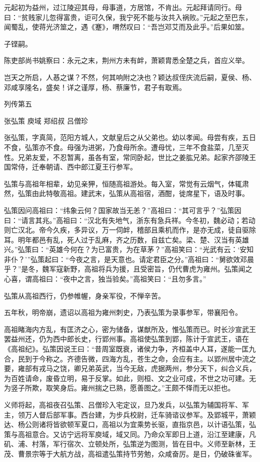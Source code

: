 \documentclass[12pt,UTF8]{ctexbook}
\begin{document}
元起初为益州，过江陵迎其母，母事道，方居馆，不肯出。元起拜请同行。母曰：“贫贱家儿忽得富贵，讵可久保，我宁死不能与汝共入祸败。”元起之至巴东，闻蜀乱，使蒋光济筮之，遇《蹇》，喟然叹曰：“吾岂邓艾而及此乎。”后果如筮。

子铿嗣。

陈吏部尚书姚察曰：永元之末，荆州方未有衅，萧颖胄悉全楚之兵，首应义举。

岂天之所启，人惎之谋？不然，何其响附之决也？颖达叔侄庆流后嗣，夏侯、杨、邓咸享隆名，盛矣！详之谨厚，杨、蔡廉节，君子有取焉。





列传第五

张弘策 庾域 郑绍叔 吕僧珍

张弘策，字真简，范阳方城人，文献皇后之从父弟也。幼以孝闻。母尝有疾，五日不食，弘策亦不食。母强为进粥，乃食母所余。遭母忧，三年不食盐菜，几至灭性。兄弟友爱，不忍暂离，虽各有室，常同卧起，世比之姜肱兄弟。起家齐邵陵王国常侍，迁奉朝请、西中郎江夏王行参军。

弘策与高祖年相辈，幼见亲狎，恒随高祖游处。每入室，常觉有云烟气，体辄肃然，弘策由此特敬高祖。建武末，弘策从高祖宿，酒酣，徙席星下，语及时事。

弘策因问高祖曰：“纬象云何？国家故当无恙？”高祖曰：“其可言乎？”弘策因曰：“请言其兆。”高祖曰：“汉北有失地气，浙东有急兵祥。今冬初，魏必动；若动则亡汉北。帝今久疾，多异议，万一伺衅，稽部且乘机而作，是亦无成，徒自驱除耳。明年都邑有乱，死人过于乱麻，齐之历数，自兹亡矣。梁、楚、汉当有英雄兴。”弘策曰：“英雄今何在？为已富贵，为在草茅？”高祖笑曰：“光武有云：‘安知非仆？’”弘策起曰：“今夜之言，是天意也。请定君臣之分。”高祖曰：“舅欲效邓晨乎？”是冬，魏军寇新野，高祖将兵为援，且受密旨，仍代曹虎为雍州。弘策闻之心喜，谓高祖曰：“夜中之言，独当验矣。”高祖笑曰：“且勿多言。”

弘策从高祖西行，仍参帷幄，身亲军役，不惮辛苦。

五年秋，明帝崩，遗诏以高祖为雍州刺史，乃表弘策为录事参军，带襄阳令。

高祖睹海内方乱，有匡济之心，密为储备，谋猷所及，惟弘策而已。时长沙宣武王罢益州还，仍为西中郎长史，行郢州事。高祖使弘策到郢，陈计于宣武王，语在《高祖纪》。弘策因说王曰：“昔周室既衰，诸侯力争，齐桓盖中人耳，遂能一匡九合，民到于今称之。齐德告微，四海方乱，苍生之命，会应有主。以郢州居中流之要，雍部有戎马之饶，卿兄弟英武，当今无敌，虎据两州，参分天下，纠合义兵，为百姓请命，废昏立明，易于反掌。如此，则桓、文之业可成，不世之功可建。无为竖子所欺，取笑身后。雍州揣之已熟，愿善图之。”王颇不怿而无以拒也。

义师将起，高祖夜召弘策、吕僧珍入宅定议，旦乃发兵，以弘策为辅国将军、军主，领万人督后部军事。西台建，为步兵校尉，迁车骑谘议参军。及郢城平，萧颖达、杨公则诸将皆欲顿军夏口，高祖以为宜乘势长驱，直指京邑，以计语弘策，弘策与高祖意合。又访宁远将军庾域，域又同。乃命众军即日上道，沿江至建康，凡矶、浦、村落，军行宿次、立顿处所，弘策逆为图测，皆在目中。义师至新林，王茂、曹景宗等于大航方战，高祖遣弘策持节劳勉，众咸奋厉。是日，仍破硃雀军。
\end{document}
